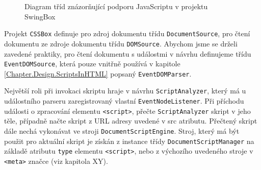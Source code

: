 \begin{figure}[H]
  \begin{center}
    \caption{Diagram tříd znázorňující podporu JavaScriptu v projektu SwingBox}
    \label{Figure.ScriptsInSwingBoxDesign}
  \end{center}
\end{figure}

Projekt \texttt{CSSBox} definuje pro zdroj dokumentu třídu \texttt{DocumentSource}, pro čtení dokumentu ze zdroje dokumentu třídu \texttt{DOMSource}. Abychom jsme se drželi zavedené praktiky, pro čtení dokumentu s událostmi v návrhu definujeme třídu \texttt{EventDOMSource}, která pouze vnitřně používá v kapitole \ref{Chapter.Design.ScriptsInHTML} popsaný \texttt{EventDOMParser}. 

Největší roli při invokaci skriptu hraje v návrhu \texttt{ScriptAnalyzer}, který má u událostního parseru zaregistrovaný vlastní \texttt{EventNodeListener}. Při příchodu události o zpracování elementu \texttt{<script>}, přečte \texttt{ScriptAnalyzer} skript v jeho těle, případně načte skript z URL adresy uvedené v src atributu. Přečtený skript dále nechá vykonávat ve stroji \texttt{DocumentScriptEngine}. Stroj, který má být použit pro aktuální skript je získán z instance třídy \texttt{DocumentScriptManager} na základě atributu \texttt{type} elementu \texttt{<script>}, nebo z výchozího uvedeného stroje v \texttt{<meta>} značce (viz kapitola XY).

